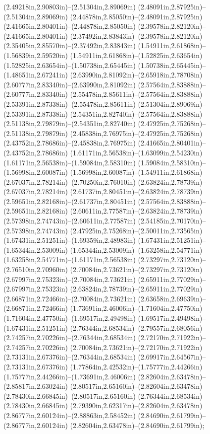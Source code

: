 (2.49218in,2.90803in)--(2.51304in,2.89069in) (2.48091in,2.87925in)--(2.51304in,2.89069in) (2.44878in,2.85050in)--(2.48091in,2.87925in) (2.41665in,2.80401in)--(2.44878in,2.85050in) (2.39578in,2.82120in)--(2.41665in,2.80401in) (2.37492in,2.83843in)--(2.39578in,2.82120in) (2.35405in,2.85570in)--(2.37492in,2.83843in) (1.54911in,2.61868in)--(1.56839in,2.59520in) (1.54911in,2.61868in)--(1.52825in,2.63654in) (1.52825in,2.63654in)--(1.50738in,2.65445in) (1.50738in,2.65445in)--(1.48651in,2.67241in) (2.63990in,2.81092in)--(2.65918in,2.78708in) (2.60777in,2.83340in)--(2.63990in,2.81092in) (2.57564in,2.83888in)--(2.60777in,2.83340in) (2.55478in,2.85611in)--(2.57564in,2.83888in) (2.53391in,2.87338in)--(2.55478in,2.85611in) (2.51304in,2.89069in)--(2.53391in,2.87338in) (2.54351in,2.82740in)--(2.57564in,2.83888in) (2.51138in,2.79879in)--(2.54351in,2.82740in) (2.47925in,2.75268in)--(2.51138in,2.79879in) (2.45838in,2.76975in)--(2.47925in,2.75268in) (2.43752in,2.78686in)--(2.45838in,2.76975in) (2.41665in,2.80401in)--(2.43752in,2.78686in) (1.61171in,2.56538in)--(1.63099in,2.54230in) (1.61171in,2.56538in)--(1.59084in,2.58310in) (1.59084in,2.58310in)--(1.56998in,2.60087in) (1.56998in,2.60087in)--(1.54911in,2.61868in) (2.67037in,2.78214in)--(2.70250in,2.76010in) (2.63824in,2.78739in)--(2.67037in,2.78214in) (2.61737in,2.80451in)--(2.63824in,2.78739in) (2.59651in,2.82168in)--(2.61737in,2.80451in) (2.57564in,2.83888in)--(2.59651in,2.82168in) (2.60611in,2.77587in)--(2.63824in,2.78739in) (2.57398in,2.74743in)--(2.60611in,2.77587in) (2.54185in,2.70170in)--(2.57398in,2.74743in) (2.47925in,2.75268in)--(2.50011in,2.73565in) (1.67431in,2.51251in)--(1.69359in,2.48983in) (1.67431in,2.51251in)--(1.65344in,2.53009in) (1.65344in,2.53009in)--(1.63258in,2.54771in) (1.63258in,2.54771in)--(1.61171in,2.56538in) (2.73297in,2.73120in)--(2.76510in,2.70960in) (2.70084in,2.73621in)--(2.73297in,2.73120in) (2.67997in,2.75323in)--(2.70084in,2.73621in) (2.65911in,2.77029in)--(2.67997in,2.75323in) (2.63824in,2.78739in)--(2.65911in,2.77029in) (2.66871in,2.72466in)--(2.70084in,2.73621in) (2.63658in,2.69639in)--(2.66871in,2.72466in) (1.73691in,2.46006in)--(1.71604in,2.47750in) (1.71604in,2.47750in)--(1.69517in,2.49498in) (1.69517in,2.49498in)--(1.67431in,2.51251in) (2.76344in,2.68534in)--(2.79557in,2.68056in) (2.74257in,2.70226in)--(2.76344in,2.68534in) (2.72170in,2.71922in)--(2.74257in,2.70226in) (2.70084in,2.73621in)--(2.72170in,2.71922in) (2.73131in,2.67376in)--(2.76344in,2.68534in) (2.69917in,2.64567in)--(2.73131in,2.67376in) (1.77864in,2.42532in)--(1.75777in,2.44266in) (1.75777in,2.44266in)--(1.73691in,2.46006in) (2.82604in,2.63478in)--(2.85817in,2.63024in) (2.80517in,2.65160in)--(2.82604in,2.63478in) (2.78430in,2.66845in)--(2.80517in,2.65160in) (2.76344in,2.68534in)--(2.78430in,2.66845in) (2.79390in,2.62317in)--(2.82604in,2.63478in) (2.86777in,2.60124in)--(2.88863in,2.58452in) (2.84690in,2.61799in)--(2.86777in,2.60124in) (2.82604in,2.63478in)--(2.84690in,2.61799in);
